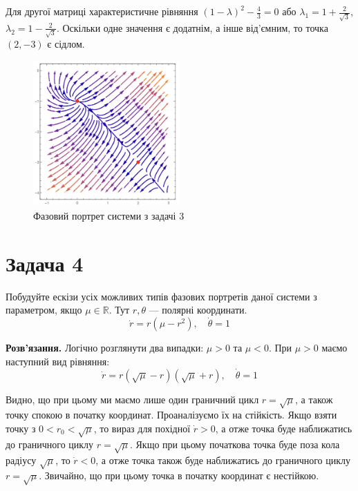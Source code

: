 \documentclass{hw_template}
\begin{document}
Для другої матриці характеристичне рівняння $(1-\lambda)^2 - \frac{4}{3} = 0$ або
$\lambda_1 = 1+\frac{2}{\sqrt{3}}$, $\lambda_2 = 1-\frac{2}{\sqrt{3}}$. Оскільки 
одне значення є додатнім, а інше від'ємним, то точка $(2,-3)$ є сідлом.

\begin{figure}[h!]
    \centering
    \includegraphics[width=0.5\textwidth]{images/test_2_problem_3_2.png}
    \caption{Фазовий портрет системи з задачі 3}
    \label{fig:phase_portrait_3}
\end{figure}

\newpage

\section{Задача 4}

\begin{problem}
    Побудуйте ескізи усіх можливих типів фазових портретів даної системи з
параметром, якщо $\mu \in \mathbb{R}$. Тут $r,\theta$ --- полярні координати.
\begin{equation*}
    \dot{r} = r(\mu - r^2), \quad \dot{\theta} = 1
\end{equation*}
\end{problem}

\textbf{Розв'язання.} Логічно розглянути два випадки: $\mu > 0$ та $\mu < 0$.
При $\mu > 0$ маємо наступний вид рівняння:
\begin{equation*}
    \dot{r} = r(\sqrt{\mu} - r)(\sqrt{\mu} + r), \quad \dot{\theta} = 1
\end{equation*}

Видно, що при цьому ми маємо лише один граничний цикл $r=\sqrt{\mu}$, а також 
точку спокою в початку координат. Проаналізуємо їх на стійкість. Якщо 
взяти точку з $0 < r_0 < \sqrt{\mu}$, то вираз для похідної $\dot{r} > 0$, а отже 
точка буде наближатись до граничного циклу $r=\sqrt{\mu}$. Якщо при цьому 
початкова точка буде поза кола радіусу $\sqrt{\mu}$, то $\dot{r} < 0$, а отже
точка також буде наближатись до граничного циклу $r=\sqrt{\mu}$. Звичайно, що 
при цьому точка в початку координат є нестійкою. 
\end{document}
